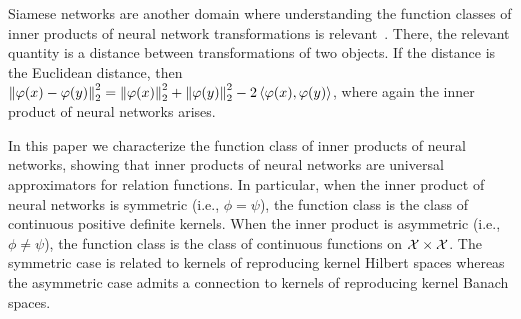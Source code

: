 
Siamese networks are another domain where understanding the function classes of inner products of neural network transformations is relevant~\parencite[e.g.,][]{chopraLearningSimilarityMetric2005}. There, the relevant quantity is a distance between transformations of two objects. If the distance is the Euclidean distance, then $\left\lVert\varphi(x) - \varphi(y)\right\rVert_{2}^2 = \left\lVert\varphi(x)\right\rVert_{2}^2 + \left\lVert\varphi(y)\right\rVert_{2}^2 - 2 \left \langle \varphi(x), \varphi(y) \right\rangle$, where again the inner product of neural networks arises.

In this paper we characterize the function class of inner products of neural networks, showing that inner products of neural networks are universal approximators for relation functions. In particular, when the inner product of neural networks is symmetric (i.e., $\phi=\psi$), the function class is the class of continuous positive definite kernels. When the inner product is asymmetric (i.e., $\phi \neq \psi$), the function class is the class of continuous functions on ${\mathcal{X}} \times {\mathcal{X}}$. The symmetric case is related to kernels of reproducing kernel Hilbert spaces whereas the asymmetric case admits a connection to kernels of reproducing kernel Banach spaces.